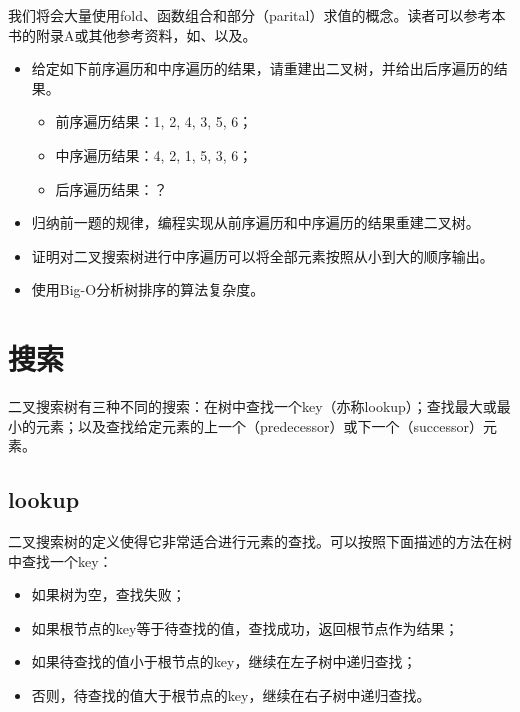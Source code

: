 \documentclass{ctexart}
\begin{document}
我们将会大量使用fold、函数组合和部分（parital）求值的概念。读者可以参考本书的附录A或其他参考资料，如\cite{wiki-fold}、\cite{func-composition}以及\cite{curry}。

\begin{Exercise}

\begin{itemize}
\item 给定如下前序遍历和中序遍历的结果，请重建出二叉树，并给出后序遍历的结果。
\begin{itemize}
\item 前序遍历结果：1, 2, 4, 3, 5, 6；
\item 中序遍历结果：4, 2, 1, 5, 3, 6；
\item 后序遍历结果：？
\end{itemize}

\item 归纳前一题的规律，编程实现从前序遍历和中序遍历的结果重建二叉树。

\item 证明对二叉搜索树进行中序遍历可以将全部元素按照从小到大的顺序输出。

\item 使用Big-O分析树排序的算法复杂度。
\end{itemize}
\end{Exercise}

\section{搜索}

二叉搜索树有三种不同的搜索：在树中查找一个key（亦称lookup）；查找最大或最小的元素；以及查找给定元素的上一个（predecessor）或下一个（successor）元素。

\subsection{lookup}
二叉搜索树的定义使得它非常适合进行元素的查找。可以按照下面描述的方法在树中查找一个key：

\begin{itemize}
\item 如果树为空，查找失败；
\item 如果根节点的key等于待查找的值，查找成功，返回根节点作为结果；
\item 如果待查找的值小于根节点的key，继续在左子树中递归查找；
\item 否则，待查找的值大于根节点的key，继续在右子树中递归查找。
\end{itemize}
\end{document}
